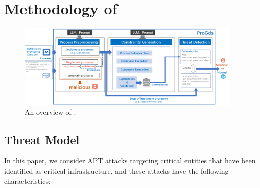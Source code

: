 \section{Methodology of \tool}

\begin{figure}[ht]
    \centering
      \includegraphics[width=0.95\textwidth]{figs/overview.pdf}
      \caption{An overview of \tool.}
    \label{fig-framework}
    \end{figure}

\subsection{Threat Model}\label{sec:threatModel}
In this paper, we consider APT attacks targeting critical entities that have been identified as critical infrastructure, and these attacks have the following characteristics:

